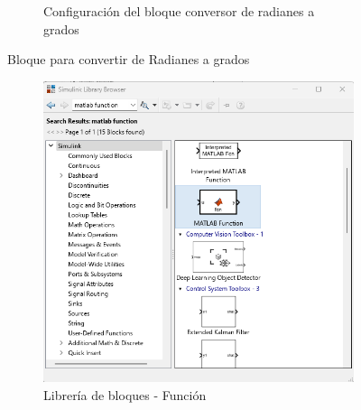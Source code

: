 \begin{figure}[htbp]
\begin{subfigure}[b]{0.45\textwidth}
        \caption{Configuración del bloque conversor de radianes a grados}
        \label{fig:conf_bloques_R2D}
    \end{subfigure}
    \caption{Bloque para convertir de Radianes a grados}
    \label{fig:bloques_R2D}
\end{figure}


\begin{figure}[htbp]
    \centering
    \begin{subfigure}[b]{0.35\textwidth}
        \centering
        \includegraphics[width=\textwidth]{fig/Capitulo5/Caso_de_estudio_IMU/Generador_de_salidas/libreria_bloque_de_funcion.png}
        \caption{Librería de bloques - Función}
        \label{fig:lib_bloques_func}
    \end{subfigure}
    \hfill
    \begin{subfigure}[b]{0.45\textwidth}
        \centering

\end{subfigure}
\end{figure}
